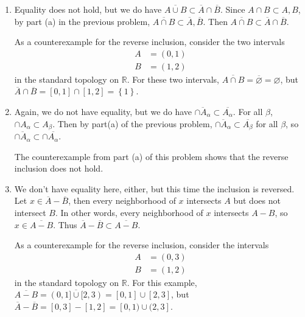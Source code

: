 \documentclass[10pt]{report}
\begin{document}
\begin{enumerate}
	\item Equality does not hold, but we do have $\overline{A \cup B} \subset \overline{A} \cap \overline{B}$. Since $A \cap B \subset A, B$, by part (a) in the previous problem, $\overline{A \cap B} \subset \overline{A}, \overline{B}$. Then $\overline{A \cap B} \subset \overline{A} \cap \overline{B}$.

		As a counterexample for the reverse inclusion, consider the two intervals
		\begin{align*}
			A &= (0, 1) \\
			B &= (1, 2)
		\end{align*}
		in the standard topology on $\mathbb{R}$. For these two intervals, $\overline{A \cap B} = \overline{\varnothing} =\varnothing$, but $\overline{A} \cap \overline{B} = [0,1] \cap [1,2] = \left\{ 1 \right\}$.

	\item Again, we do not have equality, but we do have $\overline{\cap A_{\alpha}} \subset \overline{A_{\alpha}}$. For all $\beta$, $\cap A_{\alpha}\subset A_{\beta}$. Then by part(a) of the previous problem, $\overline{\cap A_{\alpha}} \subset \overline{A_{\beta}} $ for all $\beta$, so $\overline{\cap A_{\alpha}} \subset \cap \overline{A_{\alpha}} $.

		The counterexample from part (a) of this problem shows that the reverse inclusion does not hold.

	\item We don't have equality here, either, but this time the inclusion is reversed. Let $x \in \overline{A}-\overline{B}$, then every neighborhood of $x$ intersects $A$ but does not intersect $B$. In other words, every neighborhood of $x$ intersects $A-B$, so $x \in \overline{A-B}$. Thus $\overline{A}-\overline{B} \subset \overline{A-B} $.

		As a counterexample for the reverse inclusion, consider the intervals
		\begin{align*}
			A&=(0,3) \\
			B&=(1,2)
		\end{align*}
		in the standard topology on $\mathbb{R}$. For this example, $\overline{A-B} =\overline{(0,1] \cup [2,3)} =[0,1] \cup [2,3]$, but $\overline{A}-\overline{B}=[0,3]-[1,2] = [0,1) \cup (2,3]$.
\end{enumerate}

\newpage
\end{document}
